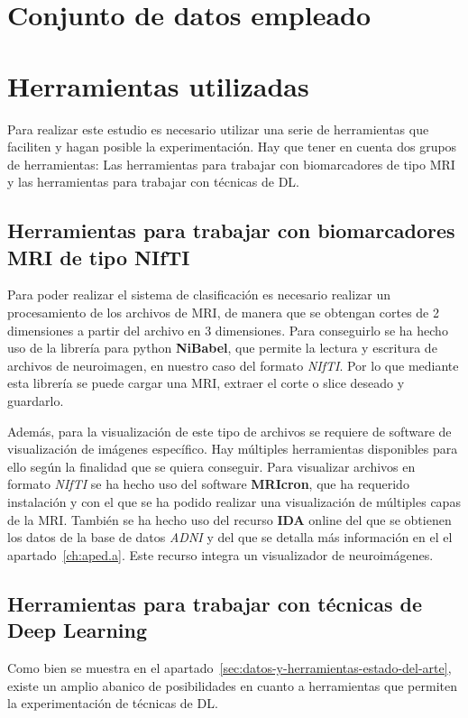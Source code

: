\section{Conjunto de datos empleado}\label{sec:conjunto-de-datos-empleado}

\section{Herramientas utilizadas}\label{sec:herramientas-utilizadas}
Para realizar este estudio es necesario utilizar una serie de herramientas que faciliten y hagan posible la 
experimentación.
Hay que tener en cuenta dos grupos de herramientas: Las herramientas para trabajar con biomarcadores de tipo MRI y las 
herramientas para trabajar con técnicas de DL.

\subsection{Herramientas para trabajar con biomarcadores MRI de tipo NIfTI}
\label{subsec:herramientas-para-trabajar-con-biomarcadores-mri-de-tipo-nifti}
Para poder realizar el sistema de clasificación es necesario realizar un procesamiento de los archivos de MRI, de 
manera que se obtengan cortes de 2 dimensiones a partir del archivo en 3 dimensiones.
Para conseguirlo se ha hecho uso de la librería para python \textbf{NiBabel}, que permite la lectura y escritura  de 
archivos de neuroimagen, en nuestro caso del formato \textit{NIfTI}.
Por lo que mediante esta librería se puede cargar una MRI, extraer el corte o slice deseado y guardarlo.

Además, para la visualización de este tipo de archivos se requiere de software de visualización de imágenes específico.
Hay múltiples herramientas disponibles para ello según la finalidad que se quiera conseguir.
Para visualizar archivos en formato \textit{NIfTI} se ha hecho uso del software \textbf{MRIcron}, que ha requerido 
instalación y con el que se ha podido realizar una visualización de múltiples capas de la MRI. También se ha hecho uso 
del recurso \textbf{IDA} online del que se obtienen los datos de la base de datos \textit{ADNI} y del que se detalla más
información en el el apartado~\ref{ch:aped.a}.
Este recurso integra un visualizador de neuroimágenes.


\subsection{Herramientas para trabajar con técnicas de Deep Learning}
\label{subsec:herramientas-para-trabajar-con-tecnicas-de-deep-learning}
Como bien se muestra en el apartado~\ref{sec:datos-y-herramientas-estado-del-arte}, existe un amplio abanico de
posibilidades en cuanto a herramientas que permiten la experimentación de técnicas de DL.

